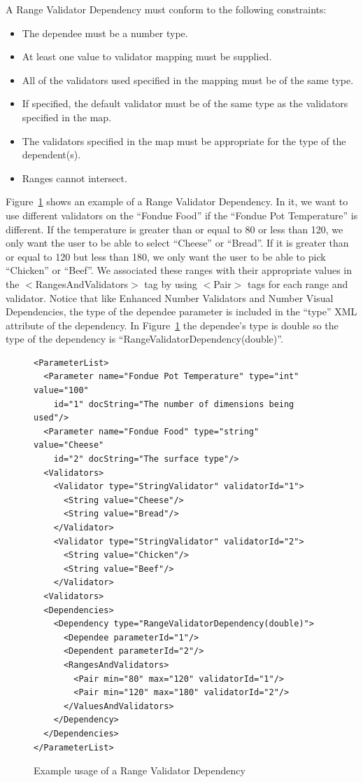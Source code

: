 A Range Validator Dependency must conform to the following constraints:
\begin{itemize}
\item The dependee must be a number type.
\item At least one value to validator mapping must be supplied.
\item All of the validators used specified in the mapping must be of the same type.
\item If specified, the default validator must be of the same type as the validators specified in the map.
\item The validators specified in the map must be appropriate for the type of the dependent(s).
\item Ranges cannot intersect.
\end{itemize}

Figure~\ref{RangeValiDepXML} shows an example of a Range Validator Dependency. In it, we want to use different validators
on the ``Fondue Food'' if the ``Fondue Pot Temperature'' is different. If the temperature is greater than or equal to 80 or less than 120,
we only want the user to be able to select ``Cheese'' or ``Bread''. If it is greater than or equal to 120 but less than 180, we only want the
user to be able to pick ``Chicken'' or ``Beef''. We associated these ranges with their appropriate values in the $<$RangesAndValidators$>$ tag by
using $<$Pair$>$ tags for each range and validator. Notice that like Enhanced Number Validators and Number Visual Dependencies, the type of the dependee parameter is 
included in the ``type'' XML attribute of the dependency. In Figure~\ref{RangeValiDepXML} the dependee's type is double so the type of the dependency is 
``RangeValidatorDependency(double)''.
\begin{figure}
\centering
{\footnotesize
\begin{verbatim}
<ParameterList>
  <Parameter name="Fondue Pot Temperature" type="int" value="100"
    id="1" docString="The number of dimensions being used"/>
  <Parameter name="Fondue Food" type="string" value="Cheese"
    id="2" docString="The surface type"/>
  <Validators>
    <Validator type="StringValidator" validatorId="1">
      <String value="Cheese"/>
      <String value="Bread"/>
    </Validator>
    <Validator type="StringValidator" validatorId="2">
      <String value="Chicken"/>
      <String value="Beef"/>
    </Validator>
  <Validators>
  <Dependencies>
    <Dependency type="RangeValidatorDependency(double)">
      <Dependee parameterId="1"/>
      <Dependent parameterId="2"/>
      <RangesAndValidators>
        <Pair min="80" max="120" validatorId="1"/>
        <Pair min="120" max="180" validatorId="2"/>
      </ValuesAndValidators>
    </Dependency>
  </Dependencies>
</ParameterList>
\end{verbatim}
}
\caption{Example usage of a Range Validator Dependency}
\label{RangeValiDepXML}
\end{figure}

